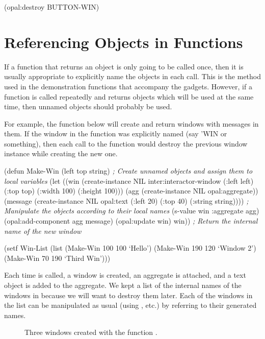 \begin{programexample}
(opal:destroy BUTTON-WIN)
\end{programexample}


\section{Referencing Objects in Functions}
\label{function}

If a function that returns an object is only going to be called once,
then it is usually appropriate to explicitly name the objects in each
 call.  This is the method used in the
demonstration functions that accompany the gadgets.  However, if a
function is called repeatedly and returns objects which will be used
at the same time, then unnamed objects should probably be used.

For example, the function below will create and return windows with
messages in them.  If the window in the function was explicitly named
(say 'WIN or something), then each call to the function would destroy
the previous window instance while creating the new one.

\begin{programexample}
(defun Make-Win (left top string)
  {\it ; Create unnamed objects and assign them to local variables}
  (let ((win (create-instance NIL inter:interactor-window
		(:left left) (:top top)
		(:width 100) (:height 100)))
	(agg (create-instance NIL opal:aggregate))
	(message (create-instance NIL opal:text
		    (:left 20) (:top 40)
		    (:string string))))
    {\it ; Manipulate the objects according to their local names}
    (s-value win :aggregate agg)
    (opal:add-component agg message)
    (opal:update win)
    win))  {\it ; Return the internal name of the new window}

(setf Win-List (list (Make-Win 100 100 `Hello')
		     (Make-Win 190 120 `Window 2')
		     (Make-Win 70 190 `Third Win')))
\end{programexample}

Each time  is called, a window is created, an aggregate
is attached, and a text object is added to the aggregate.  We kept a
list of the internal names of the windows in  because we
will want to destroy them later.  Each of the windows in the list can
be manipulated as usual (using , etc.) by referring to
their generated names.

\begin{figure}
\begin{center}
\begin{makeimage}
\end{makeimage}
\begin{latexonly}
\end{latexonly}
    \end{center}
\caption{Three windows created with the function .}
\end{figure}

